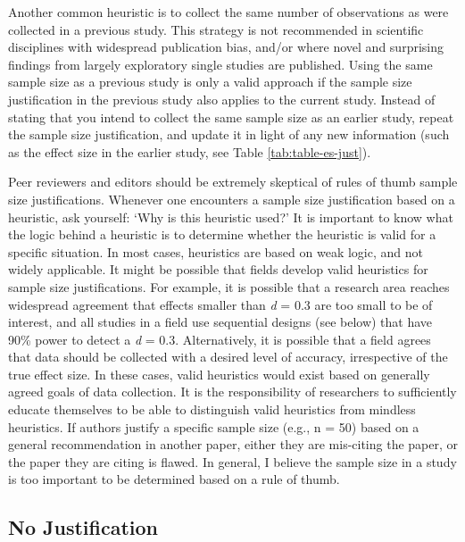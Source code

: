 \documentclass[
  english,
  ,jou, a4paper,floatsintext]{apa6}
\begin{document}
Another common heuristic is to collect the same number of observations as were collected in a previous study. This strategy is not recommended in scientific disciplines with widespread publication bias, and/or where novel and surprising findings from largely exploratory single studies are published. Using the same sample size as a previous study is only a valid approach if the sample size justification in the previous study also applies to the current study. Instead of stating that you intend to collect the same sample size as an earlier study, repeat the sample size justification, and update it in light of any new information (such as the effect size in the earlier study, see Table \ref{tab:table-es-just}).

Peer reviewers and editors should be extremely skeptical of rules of thumb sample size justifications. Whenever one encounters a sample size justification based on a heuristic, ask yourself: `Why is this heuristic used?' It is important to know what the logic behind a heuristic is to determine whether the heuristic is valid for a specific situation. In most cases, heuristics are based on weak logic, and not widely applicable. It might be possible that fields develop valid heuristics for sample size justifications. For example, it is possible that a research area reaches widespread agreement that effects smaller than \emph{d} = 0.3 are too small to be of interest, and all studies in a field use sequential designs (see below) that have 90\% power to detect a \emph{d} = 0.3. Alternatively, it is possible that a field agrees that data should be collected with a desired level of accuracy, irrespective of the true effect size. In these cases, valid heuristics would exist based on generally agreed goals of data collection. It is the responsibility of researchers to sufficiently educate themselves to be able to distinguish valid heuristics from mindless heuristics. If authors justify a specific sample size (e.g., n = 50) based on a general recommendation in another paper, either they are mis-citing the paper, or the paper they are citing is flawed. In general, I believe the sample size in a study is too important to be determined based on a rule of thumb.

\hypertarget{no-justification}{%
\subsection{No Justification}\label{no-justification}}
\end{document}
